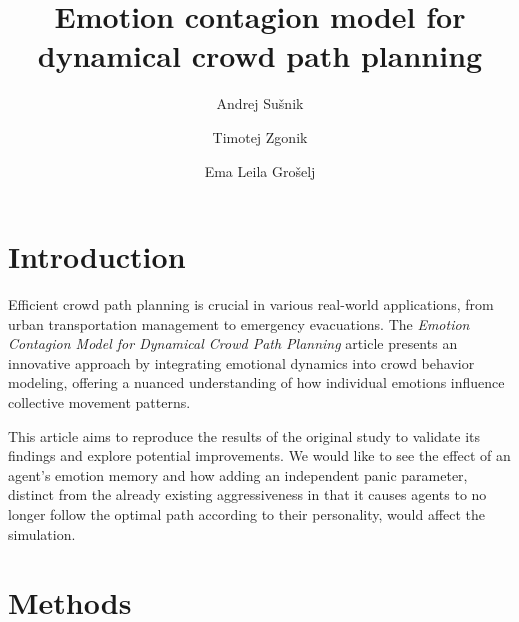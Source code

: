\documentclass[9pt]{pnas-new}
\title{Emotion contagion model for dynamical crowd path planning}
\author{Andrej Sušnik}
\author{Timotej Zgonik}
\author{Ema Leila Grošelj}
\affil{Collective behaviour course research seminar report}
\begin{document}
\verticaladjustment{-2pt}

\maketitle
\thispagestyle{firststyle}


\section{Introduction}
Efficient crowd path planning is crucial in various real-world applications, from urban transportation management to emergency evacuations. The \textit{Emotion Contagion Model for Dynamical Crowd Path Planning} article presents an innovative approach by integrating emotional dynamics into crowd behavior modeling, offering a nuanced understanding of how individual emotions influence collective movement patterns.

This article aims to reproduce the results of the original study to validate its findings and explore potential improvements. We would like to see the effect of an agent's emotion memory and how adding an independent panic parameter, distinct from the already existing aggressiveness in that it causes agents to no longer follow the optimal path according to their personality, would affect the simulation.

\section{Methods}
\end{document}
